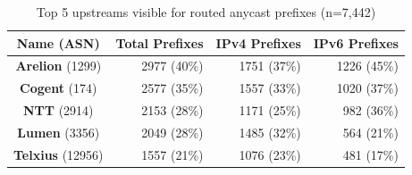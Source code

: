 \begin{table}[H]
    \centering
    \caption{Top 5 upstreams visible for routed anycast prefixes (n=7,442)}
    \begin{tabular}{crrr}
        \toprule
        Name (ASN) & Total Prefixes & IPv4 Prefixes & IPv6 Prefixes \\
        \midrule
        \textbf{Arelion} (1299) & \num{2977} (40\%) & \num{1751} (37\%) & \num{1226} (45\%) \\
        \textbf{Cogent} (174) & \num{2577} (35\%) & \num{1557} (33\%) & \num{1020} (37\%) \\
        \textbf{NTT} (2914) & \num{2153} (28\%) & \num{1171} (25\%) & \num{982} (36\%) \\
        \textbf{Lumen} (3356) & \num{2049} (28\%) & \num{1485} (32\%) & \num{564} (21\%) \\
        \textbf{Telxius} (12956) & \num{1557} (21\%) & \num{1076} (23\%) & \num{481} (17\%) \\
        \bottomrule
    \end{tabular}
    \label{tab:anycast_upstreams}
\end{table}

